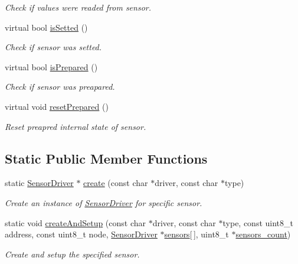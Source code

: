 \begin{DoxyCompactItemize}
\begin{DoxyCompactList}\small\item\em Check if values were readed from sensor. \end{DoxyCompactList}\item 
virtual bool \hyperlink{classSensorDriver_a0f64839cf7719b5782c93e54485d3b11}{is\+Setted} ()
\begin{DoxyCompactList}\small\item\em Check if sensor was setted. \end{DoxyCompactList}\item 
virtual bool \hyperlink{classSensorDriver_a17672e5f12749c3dca5d6c2c4b73b7c3}{is\+Prepared} ()
\begin{DoxyCompactList}\small\item\em Check if sensor was preapared. \end{DoxyCompactList}\item 
virtual void \hyperlink{classSensorDriver_a2b347ee438af49b939cb1e79c068681f}{reset\+Prepared} ()
\begin{DoxyCompactList}\small\item\em Reset preapred internal state of sensor. \end{DoxyCompactList}\end{DoxyCompactItemize}
\subsection*{Static Public Member Functions}
\begin{DoxyCompactItemize}
\item 
static \hyperlink{classSensorDriver}{Sensor\+Driver} $\ast$ \hyperlink{classSensorDriver_a42e3b501ef28a0a8ba7e045f84e3d76a}{create} (const char $\ast$driver, const char $\ast$type)
\begin{DoxyCompactList}\small\item\em Create an instance of \hyperlink{classSensorDriver}{Sensor\+Driver} for specific sensor. \end{DoxyCompactList}\item 
static void \hyperlink{classSensorDriver_a8b3cc902953a0850241c625772757580}{create\+And\+Setup} (const char $\ast$driver, const char $\ast$type, const uint8\+\_\+t address, const uint8\+\_\+t node, \hyperlink{classSensorDriver}{Sensor\+Driver} $\ast$\hyperlink{i2c-th_8h_a5f5c708cbddb6cef952fb9a28c8ba835}{sensors}\mbox{[}$\,$\mbox{]}, uint8\+\_\+t $\ast$\hyperlink{i2c-th_8h_a7727577f63dfa4aa55feb7ddd0739f83}{sensors\+\_\+count})
\begin{DoxyCompactList}\small\item\em Create and setup the specified sensor. \end{DoxyCompactList}\end{DoxyCompactItemize}
